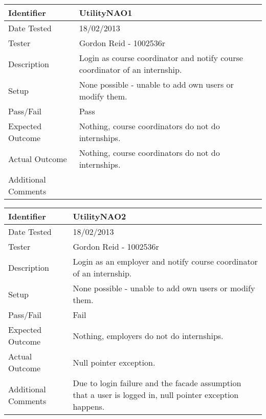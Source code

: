 \begin{tabularx}{\textwidth}{|T|L|}
\hline
Identifier & UtilityNAO1\\
\hline
Date Tested & 18/02/2013\\
\hline
Tester & Gordon Reid - 1002536r\\
\hline
Description & Login as course coordinator and notify course coordinator of an 
internship.\\
\hline
Setup & None possible - unable to add own users or modify them.\\
\hline
Pass/Fail & Pass\\
\hline
Expected Outcome & Nothing, course coordinators do not do internships.\\
\hline
Actual Outcome & Nothing, course coordinators do not do internships.\\
\hline
Additional Comments &\\
\hline
\end{tabularx}

\vspace{2em}

\begin{tabularx}{\textwidth}{|T|L|}
\hline
Identifier & UtilityNAO2\\
\hline
Date Tested & 18/02/2013\\
\hline
Tester & Gordon Reid - 1002536r\\
\hline
Description & Login as an employer and notify course coordinator of an 
internship.\\
\hline
Setup & None possible - unable to add own users or modify them.\\
\hline
Pass/Fail & Fail\\
\hline
Expected Outcome & Nothing, employers do not do internships.\\
\hline
Actual Outcome & Null pointer exception.\\
\hline
Additional Comments & Due to login failure and the facade assumption that a
user is logged in, null pointer exception happens.\\
\hline
\end{tabularx}

\vspace{2em}

